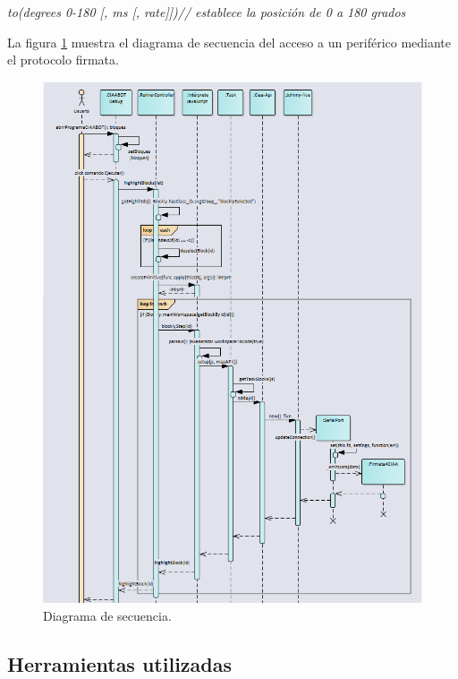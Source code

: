 \emph{to(degrees 0-180 [, ms [, rate]])// establece la posición de 0 a 180 grados}


La figura \ref{fig:DocSecuencia} muestra el diagrama de secuencia del acceso a un periférico mediante el protocolo firmata.


\begin{figure}[!htbp]
	\begin{center}  %
		\includegraphics*[width=15cm]{./Figures/DocSecuencia.PNG}
		\par\caption{Diagrama de secuencia.}\label{fig:DocSecuencia}
	\end{center}
\end{figure}


\subsection{Herramientas utilizadas}
\label{subsec:Implementación del modelo computacional Servicios}

